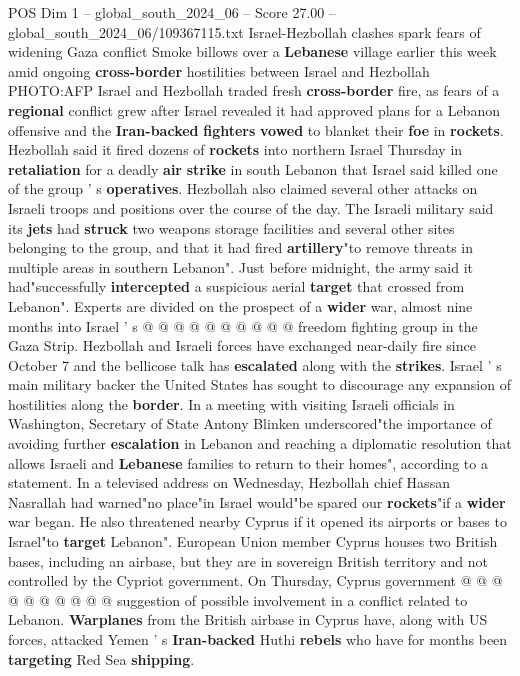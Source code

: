 \begin{textsample}{POS Dim 1 – global\_south\_2024\_06 – Score 27.00 – global\_south\_2024\_06/109367115.txt}  \label{ex:f1_pos_131}
Israel-Hezbollah clashes spark fears of widening Gaza conflict Smoke billows over a \textbf{Lebanese} village earlier this week amid ongoing \textbf{cross-border} hostilities between Israel and Hezbollah PHOTO:AFP Israel and Hezbollah traded fresh \textbf{cross-border} fire, as fears of a \textbf{regional} conflict grew after Israel revealed it had approved plans for a Lebanon offensive and the \textbf{Iran-backed} \textbf{fighters} \textbf{vowed} to blanket their \textbf{foe} in \textbf{rockets}.
Hezbollah said it fired dozens of \textbf{rockets} into northern Israel Thursday in \textbf{retaliation} for a deadly \textbf{air} \textbf{strike} in south Lebanon that Israel said killed one of the group ' s \textbf{operatives}.
Hezbollah also claimed several other attacks on Israeli troops and positions over the course of the day.
The Israeli military said its \textbf{jets} had \textbf{struck} two weapons storage facilities and several other sites belonging to the group, and that it had fired \textbf{artillery}"to remove threats in multiple areas in southern Lebanon".
Just before midnight, the army said it had"successfully \textbf{intercepted} a suspicious aerial \textbf{target} that crossed from Lebanon".
Experts are divided on the prospect of a \textbf{wider} war, almost nine months into Israel ' s @ @ @ @ @ @ @ @ @ @ freedom fighting group in the Gaza Strip.
Hezbollah and Israeli forces have exchanged near-daily fire since October 7 and the bellicose talk has \textbf{escalated} along with the \textbf{strikes}.
Israel ' s main military backer the United States has sought to discourage any expansion of hostilities along the \textbf{border}.
In a meeting with visiting Israeli officials in Washington, Secretary of State Antony Blinken underscored"the importance of avoiding further \textbf{escalation} in Lebanon and reaching a diplomatic resolution that allows Israeli and \textbf{Lebanese} families to return to their homes", according to a statement.
In a televised address on Wednesday, Hezbollah chief Hassan Nasrallah had warned"no place"in Israel would"be spared our \textbf{rockets}"if a \textbf{wider} war began.
He also threatened nearby Cyprus if it opened its airports or bases to Israel"to \textbf{target} Lebanon".
European Union member Cyprus houses two British bases, including an airbase, but they are in sovereign British territory and not controlled by the Cypriot government.
On Thursday, Cyprus government @ @ @ @ @ @ @ @ @ @ suggestion of possible involvement in a conflict related to Lebanon. \textbf{Warplanes} from the British airbase in Cyprus have, along with US forces, attacked Yemen ' s \textbf{Iran-backed} Huthi \textbf{rebels} who have for months been \textbf{targeting} Red Sea \textbf{shipping}.

\end{textsample}
